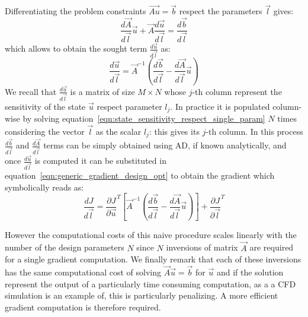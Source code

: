 Differentiating the problem constraints $\vec{Au} = \vec{b}$ respect the parameters $\vec{l}$ gives:
\begin{equation}
	\frac{d\vec{A}}{d\vec{l}} \vec{u} + \vec{A} \frac{d\vec{u}}{d\vec{l}} = \frac{d\vec{b}}{d\vec{l}}
\end{equation}
which allows to obtain the sought term $\frac{d\vec{u}}{d\vec{l}}$ as:
\begin{equation}
	\label{eqn:state_sensitivity_respect_single_param}
	\frac{d\vec{u}}{d\vec{l}} = \vec{A}^{-1} \left( \frac{d\vec{b}}{d\vec{l}} - \frac{d\vec{A}}{d\vec{l}}\vec{u} \right)
\end{equation}
We recall that $\frac{d\vec{u}}{d\vec{l}}$ is a matrix of size $M \times N$ whose $j$-th column represent the sensitivity of the state $\vec{u}$ respect parameter $l_j$. In practice it is populated column-wise by solving equation~\eqref{eqn:state_sensitivity_respect_single_param} $N$ times considering the vector $\vec{l}$ as the scalar $l_j$: this gives its $j$-th column. In this process $\frac{d\vec{b}}{d\vec{l}}$ and $\frac{d\vec{A}}{d\vec{l}}$ terms can be simply obtained using AD, if known analytically, and once $\frac{d\vec{u}}{d\vec{l}}$ is computed it can be substituted in equation~\eqref{eqn:generic_gradient_design_opt} to obtain the gradient which symbolically reads as:
\begin{equation}
	\label{eqn:generic_gradient_design_opt_naive}
	\frac{dJ}{d\vec{l}} = \frac{\partial J}{\partial \vec{u}}^T \left[ \vec{A}^{-1} \left( \frac{d\vec{b}}{d\vec{l}} - \frac{d\vec{A}}{d\vec{l}}\vec{u} \right) \right]  + \frac{\partial J}{\partial \vec{l}}^T
\end{equation}

However the computational costs of this naive procedure scales linearly with the number of the design parameters $N$ since $N$ inversions of matrix $\vec{A}$ are required for a single gradient computation. We finally remark that each of these inversions has the same computational cost of solving $\vec{A} \vec{u}= \vec{b}$ for $\vec{u}$ and if the solution represent the output of a particularly time consuming computation, as a a CFD simulation is an example of, this is particularly penalizing. A more efficient gradient computation is therefore required.

